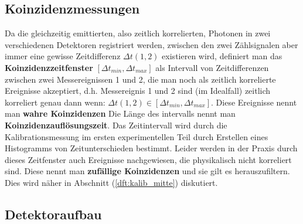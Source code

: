 \subsection{Koinzidenzmessungen}
	Da die gleichzeitig emittierten, also zeitlich korrelierten, Photonen in zwei verschiedenen Detektoren registriert werden, zwischen den zwei Zählsignalen aber immer eine gewisse Zeitdifferenz $\Delta t(1,2)$ existieren wird, definiert man das \textbf{Koinzidenzzeitfenster} $[\Delta t_{min}, \Delta t_{max}]$ als Intervall von Zeitdifferenzen zwischen zwei Messereignissen 1 und 2, die man noch als zeitlich korrelierte Ereignisse akzeptiert, d.h. Messereignis 1 und 2 sind (im Idealfall) zeitlich korreliert genau dann wenn: $\Delta t(1,2) \in [\Delta t_{min}, \Delta t_{max}]$. Diese Ereignisse nennt man \textbf{wahre Koinzidenzen} Die Länge des intervalls nennt man \textbf{Koinzidenzauflösungszeit}. Das Zeitintervall wird durch die Kalibrationsmessung im ersten experimentellen Teil durch Erstellen eines Histogramms von Zeitunterschieden bestimmt. Leider werden in der Praxis durch dieses Zeitfenster auch Ereignisse nachgewiesen, die physikalisch nicht korreliert sind. Diese nennt man \textbf{zufällige Koinzidenzen} und sie gilt es herauszufiltern.\cite{PA} Dies wird näher in Abschnitt (\ref{dft:kalib_mitte}) diskutiert.


\subsection{Detektoraufbau}
